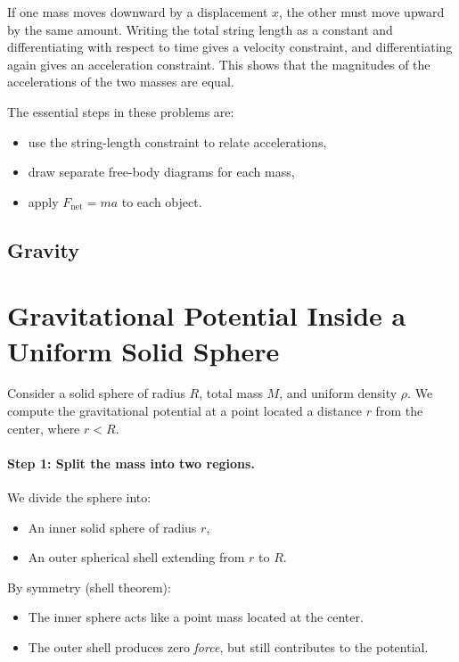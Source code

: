 \documentclass{article}
\begin{document}
If one mass moves downward by a displacement $x$, the other must move upward by the same amount. Writing the total string length as a constant and differentiating with respect to time gives a velocity constraint, and differentiating again gives an acceleration constraint. This shows that the magnitudes of the accelerations of the two masses are equal.

The essential steps in these problems are:
\begin{itemize}
    \item use the string-length constraint to relate accelerations,
    \item draw separate free-body diagrams for each mass,
    \item apply $F_{\text{net}} = ma$ to each object.
\end{itemize}

\subsection{Gravity}

\section{Gravitational Potential Inside a Uniform Solid Sphere}

Consider a solid sphere of radius $R$, total mass $M$, and uniform density $\rho$. We compute the gravitational potential at a point located a distance $r$ from the center, where $r < R$.

\paragraph{Step 1: Split the mass into two regions.}

We divide the sphere into:

\begin{itemize}
    \item An inner solid sphere of radius $r$,
    \item An outer spherical shell extending from $r$ to $R$.
\end{itemize}

By symmetry (shell theorem):

\begin{itemize}
    \item The inner sphere acts like a point mass located at the center.
    \item The outer shell produces zero \emph{force}, but still contributes to the potential.
\end{itemize}
\end{document}

